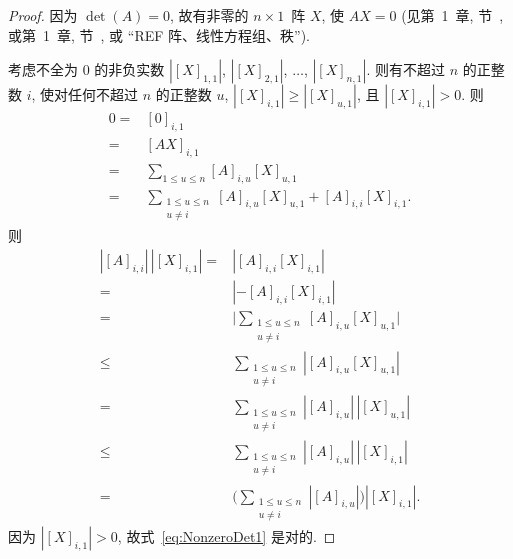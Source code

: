 \documentclass[../libro.tex]{subfiles}
\begin{document}
\begin{proof}
    因为 \(\det {(A)} = 0\),
    故有非零的 \(n \times 1\)~阵 \(X\),
    使 \(A X = 0\)
    (见第~1~章, 节~, %
    或第~1~章, 节~,
    或 ``REF 阵、线性方程组、秩''). %

    考虑不全为 \(0\) 的非负实数
    \(|[X]_{1,1}|\), \(|[X]_{2,1}|\), \(\dots\), \(|[X]_{n,1}|\).
    则有不超过 \(n\) 的正整数 \(i\),
    使对任何不超过 \(n\) 的正整数 \(u\),
    \(|[X]_{i,1}| \geq |[X]_{u,1}|\),
    且 \(|[X]_{i,1}| > 0\).
    则
    \begin{align*}
        0
        = {} &
        [0]_{i,1}
        \\
        = {} &
        [A X]_{i,1}
        \\
        = {} &
        \sum_{1 \leq u \leq n}
        {[A]_{i,u} [X]_{u,1}}
        \\
        = {} &
        \sum_{\substack{1 \leq u \leq n \\ u \neq i}}
        {[A]_{i,u} [X]_{u,1}}
        + [A]_{i,i} [X]_{i,1}.
    \end{align*}
    则
    \begin{align*}
        |[A]_{i,i}|\,|[X]_{i,1}|
        = {} &
        |{[A]_{i,i} [X]_{i,1}}|
        \\
        = {} &
        |{-[A]_{i,i} [X]_{i,1}}|
        \\
        = {} &
        \Bigg|
        \sum_{\substack{1 \leq u \leq n \\ u \neq i}}
        {[A]_{i,u} [X]_{u,1}}
        \Bigg|
        \\
        \leq {} &
        \sum_{\substack{1 \leq u \leq n \\ u \neq i}}
        {|{[A]_{i,u} [X]_{u,1}}|}
        \\
        = {} &
        \sum_{\substack{1 \leq u \leq n \\ u \neq i}}
        {|[A]_{i,u}|\, |[X]_{u,1}|}
        \\
        \leq {} &
        \sum_{\substack{1 \leq u \leq n \\ u \neq i}}
        {|[A]_{i,u}|\, |[X]_{i,1}|}
        \\
        = {} &
        \Bigg(
            \sum_{\substack{1 \leq u \leq n \\ u \neq i}}
            {|[A]_{i,u}|}
        \Bigg) |[X]_{i,1}|.
    \end{align*}
    因为 \(|[X]_{i,1}| > 0\),
    故式~\eqref{eq:NonzeroDet1} 是对的.
\end{proof}
\end{document}
